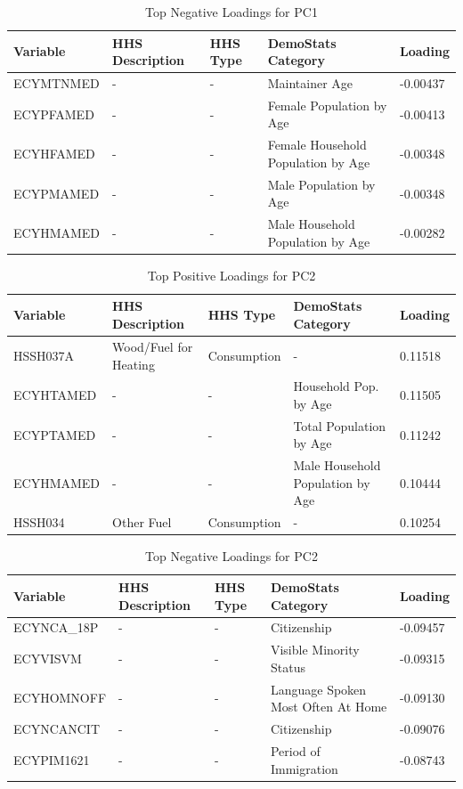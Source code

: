 \documentclass{article}
\begin{document}
\begin{table}[H]
\centering
\caption{Top Negative Loadings for PC1}
\label{tab:pc1_neg}
\begin{tabular}{@{}lllll@{}}
\toprule
Variable & HHS Description & HHS Type & DemoStats Category & Loading \\
\midrule
ECYMTNMED & - & - & Maintainer Age & -0.00437 \\
ECYPFAMED & - & - & Female Population by Age & -0.00413 \\
ECYHFAMED & - & - & Female Household Population by Age & -0.00348 \\
ECYPMAMED & - & - & Male Population by Age & -0.00348 \\
ECYHMAMED & - & - & Male Household Population by Age & -0.00282 \\
\bottomrule
\end{tabular}
\end{table}

\begin{table}[H]
\centering
\caption{Top Positive Loadings for PC2}
\label{tab:pc2_pos}
\begin{tabular}{@{}lllll@{}}
\toprule
Variable & HHS Description & HHS Type & DemoStats Category & Loading \\
\midrule
HSSH037A & Wood/Fuel for Heating & Consumption & - & 0.11518 \\
ECYHTAMED & - & - & Household Pop. by Age & 0.11505 \\
ECYPTAMED & - & - & Total Population by Age & 0.11242 \\
ECYHMAMED & - & - & Male Household Population by Age & 0.10444 \\
HSSH034 & Other Fuel & Consumption & - & 0.10254 \\
\bottomrule
\end{tabular}
\end{table}

\begin{table}[H]
\centering
\caption{Top Negative Loadings for PC2}
\label{tab:pc2_neg}
\begin{tabular}{@{}lllll@{}}
\toprule
Variable & HHS Description & HHS Type & DemoStats Category & Loading \\
\midrule
ECYNCA\_18P & - & - & Citizenship & -0.09457 \\
ECYVISVM & - & - & Visible Minority Status & -0.09315 \\
ECYHOMNOFF & - & - & Language Spoken Most Often At Home & -0.09130 \\
ECYNCANCIT & - & - & Citizenship & -0.09076 \\
ECYPIM1621 & - & - & Period of Immigration & -0.08743 \\
\bottomrule
\end{tabular}
\end{table}
\end{document}
